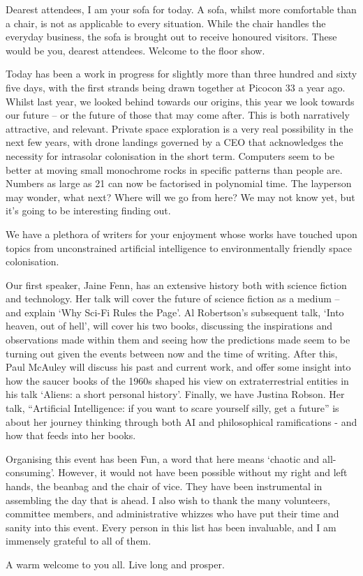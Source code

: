 Dearest attendees, I am your sofa for today.
A sofa, whilst more comfortable than a chair, is not as applicable to every situation. While the chair handles the everyday business, the sofa is brought out to receive honoured visitors. These would be you, dearest attendees.
Welcome to the floor show.

Today has been a work in progress for slightly more than three hundred and sixty five days, with the first strands being drawn together at Picocon 33 a year ago. Whilst last year, we looked behind towards our origins, this year we look towards our future – or the future of those that may come after.  This is both narratively attractive, and relevant. Private space exploration is a very real possibility in the next few years,  with drone landings governed by a CEO that acknowledges the necessity for intrasolar colonisation in the short term. Computers seem to be better at moving small monochrome rocks in specific patterns than people are.  Numbers as large as 21 can now be factorised in polynomial time. The layperson may wonder, what next? Where will we go from here? We may not know yet, but it’s going to be interesting finding out.

We have a plethora of writers for your enjoyment whose works have touched upon topics from unconstrained artificial intelligence to environmentally friendly space colonisation.

Our first speaker, Jaine Fenn, has an extensive history both with science fiction and technology. Her talk will cover the future of science fiction as a medium – and explain ‘Why Sci-Fi Rules the Page’.  Al Robertson’s subsequent talk, `Into heaven, out of hell’, will cover his two books, discussing the inspirations and observations made within them and seeing how the predictions made seem to be turning out given the events between now and the time of writing.  After this, Paul McAuley will discuss his past and current work, and offer some insight into how the saucer books of the 1960s shaped his view on extraterrestrial entities in his talk `Aliens: a short personal history’.  Finally, we have Justina Robson. Her talk, ``Artificial Intelligence: if you want to scare yourself silly, get a future'' is about her journey thinking through both AI and philosophical ramifications - and how that feeds into her books.

Organising this event has been Fun, a word that here means `chaotic and all-consuming’. However, it would not have been possible without my right and left hands, the beanbag and the chair of vice. They have been instrumental in assembling the day that is ahead. I also wish to thank the many volunteers, committee members, and administrative whizzes who have put their time and sanity into this event. Every person in this list has been invaluable, and I am immensely grateful to all of them.

A warm welcome to you all. Live long and prosper.
